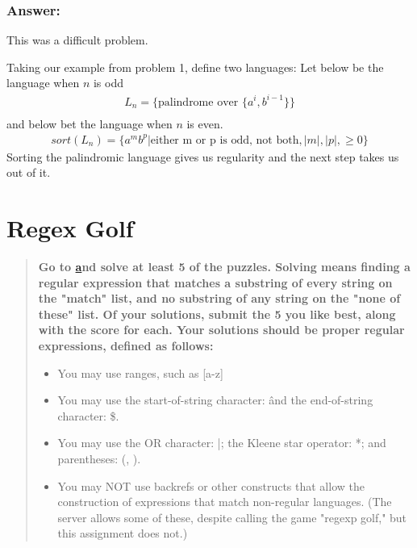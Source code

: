 \documentclass[titlepage]{article}\usepackage[]{graphicx}\usepackage[]{color}
\begin{document}
\subsubsection*{Answer:}

This was a difficult problem. 

Taking our example from problem 1, define two languages:
Let below be the language when $n$ is odd
\begin{align*}
L_n =\{ \text{palindrome over } \{ a^i,b^{i-1} \} \} \\
\end{align*}
and below bet the language when $n$ is even. 
\begin{align*}
sort(L_n) = \{a^mb^p | \text{either m or p is odd, not both}, |m|, |p|, \geq 0\} 
\end{align*}
Sorting the palindromic language gives us regularity and the next step takes us out of it.




\section{Regex Golf}
\begin{quote}
  \textbf{Go to \href{https://regex.alf.nu/} and solve at least 5 of the
  puzzles.  Solving means finding a regular expression that matches a substring
of every string on the "match" list, and no substring of any string on the
"none of these" list. Of your solutions, submit the 5 you like best, along
with the score for each.  Your solutions should be proper regular expressions,
defined as follows:}
\begin{itemize}
  \item You may use ranges, such as [a-z]
  \item You may use the start-of-string character: \^
    and the end-of-string character: \$.
  \item You may use the OR character: |; 
    the Kleene star operator: *; and parentheses: (, ).
  \item You may NOT use backrefs or other constructs that allow the construction of
        expressions that match non-regular languages.  (The server allows some of
        these, despite calling the game "regexp golf," but this assignment does not.)
\end{itemize}
\end{quote}
\end{document}
